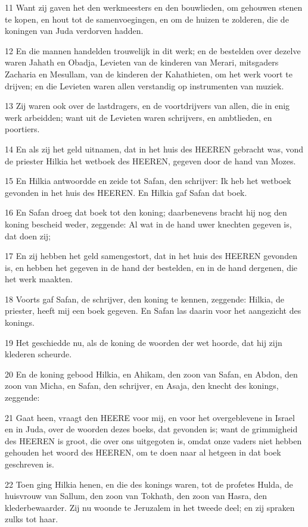 \par 11 Want zij gaven het den werkmeesters en den bouwlieden, om gehouwen stenen te kopen, en hout tot de samenvoegingen, en om de huizen te zolderen, die de koningen van Juda verdorven hadden.
\par 12 En die mannen handelden trouwelijk in dit werk; en de bestelden over dezelve waren Jahath en Obadja, Levieten van de kinderen van Merari, mitsgaders Zacharia en Mesullam, van de kinderen der Kahathieten, om het werk voort te drijven; en die Levieten waren allen verstandig op instrumenten van muziek.
\par 13 Zij waren ook over de lastdragers, en de voortdrijvers van allen, die in enig werk arbeidden; want uit de Levieten waren schrijvers, en ambtlieden, en poortiers.
\par 14 En als zij het geld uitnamen, dat in het huis des HEEREN gebracht was, vond de priester Hilkia het wetboek des HEEREN, gegeven door de hand van Mozes.
\par 15 En Hilkia antwoordde en zeide tot Safan, den schrijver: Ik heb het wetboek gevonden in het huis des HEEREN. En Hilkia gaf Safan dat boek.
\par 16 En Safan droeg dat boek tot den koning; daarbenevens bracht hij nog den koning bescheid weder, zeggende: Al wat in de hand uwer knechten gegeven is, dat doen zij;
\par 17 En zij hebben het geld samengestort, dat in het huis des HEEREN gevonden is, en hebben het gegeven in de hand der bestelden, en in de hand dergenen, die het werk maakten.
\par 18 Voorts gaf Safan, de schrijver, den koning te kennen, zeggende: Hilkia, de priester, heeft mij een boek gegeven. En Safan las daarin voor het aangezicht des konings.
\par 19 Het geschiedde nu, als de koning de woorden der wet hoorde, dat hij zijn klederen scheurde.
\par 20 En de koning gebood Hilkia, en Ahikam, den zoon van Safan, en Abdon, den zoon van Micha, en Safan, den schrijver, en Asaja, den knecht des konings, zeggende:
\par 21 Gaat heen, vraagt den HEERE voor mij, en voor het overgeblevene in Israel en in Juda, over de woorden dezes boeks, dat gevonden is; want de grimmigheid des HEEREN is groot, die over ons uitgegoten is, omdat onze vaders niet hebben gehouden het woord des HEEREN, om te doen naar al hetgeen in dat boek geschreven is.
\par 22 Toen ging Hilkia henen, en die des konings waren, tot de profetes Hulda, de huisvrouw van Sallum, den zoon van Tokhath, den zoon van Hasra, den klederbewaarder. Zij nu woonde te Jeruzalem in het tweede deel; en zij spraken zulks tot haar.
